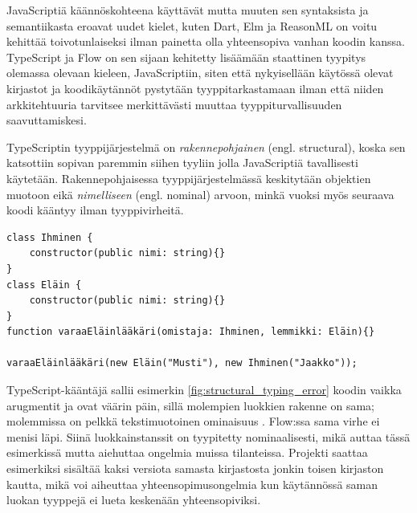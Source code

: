 JavaScriptiä käännöskohteena käyttävät
mutta muuten sen syntaksista ja semantiikasta eroavat uudet kielet,
kuten Dart, Elm ja ReasonML on voitu kehittää toivotunlaiseksi ilman painetta olla
yhteensopiva vanhan koodin kanssa. TypeScript ja Flow on sen sijaan kehitetty
lisäämään staattinen tyypitys olemassa olevaan kieleen, JavaScriptiin,
siten että nykyisellään käytössä olevat kirjastot ja koodikäytännöt pystytään
tyyppitarkastamaan ilman että niiden arkkitehtuuria tarvitsee merkittävästi
muuttaa tyyppiturvallisuuden saavuttamiskesi.

TypeScriptin tyyppijärjestelmä on \textit{rakennepohjainen} (engl. structural),
koska sen katsottiin sopivan paremmin siihen tyyliin jolla JavaScriptiä tavallisesti
käytetään. Rakennepohjaisessa tyyppijärjestelmässä keskitytään objektien muotoon
eikä \textit{nimelliseen} (engl. nominal) arvoon, minkä vuoksi myös seuraava koodi kääntyy
ilman tyyppivirheitä.

\begin{lstlisting}[caption={
  Loogisen virheen sisältävä, mutta ilman varoituksia kääntyvä TypeScript-ohjelma.
}, label={fig:structural_typing_error}]
class Ihminen {
    constructor(public nimi: string){}
}
class Eläin {
    constructor(public nimi: string){}
}
function varaaEläinlääkäri(omistaja: Ihminen, lemmikki: Eläin){}

varaaEläinlääkäri(new Eläin("Musti"), new Ihminen("Jaakko"));
\end{lstlisting}
TypeScript-kääntäjä sallii esimerkin \ref{fig:structural_typing_error} koodin
vaikka arugmentit \mbox{} ja \mbox{}
ovat väärin päin, sillä molempien luokkien rakenne on sama; molemmissa on
pelkkä tekstimuotoinen ominaisuus . Flow:ssa sama virhe ei menisi läpi.
Siinä luokkainstanssit on tyypitetty nominaalisesti, mikä auttaa tässä
esimerkissä mutta aiehuttaa ongelmia muissa tilanteissa. Projekti saattaa
esimerkiksi sisältää kaksi versiota samasta kirjastosta jonkin toisen
kirjaston kautta, mikä voi aiheuttaa yhteensopimusongelmia kun käytännössä
saman luokan tyyppejä ei lueta keskenään yhteensopiviksi.